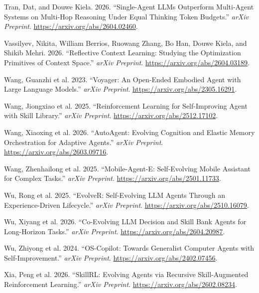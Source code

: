 \documentclass[
]{article}
\newlength{\cslhangindent}
\newenvironment{CSLReferences}[2] %
 {\begin{list}{}{%
  \setlength{\itemindent}{0pt}
  \setlength{\leftmargin}{0pt}
  \setlength{\parsep}{0pt}
  \ifodd #1
   \setlength{\leftmargin}{\cslhangindent}
   \setlength{\itemindent}{-1\cslhangindent}
  \fi
  \setlength{\itemsep}{#2\baselineskip}}}
 {\end{list}}
\begin{document}
\begin{CSLReferences}{1}{1}
Tran, Dat, and Douwe Kiela. 2026. {``Single-Agent {LLMs} Outperform
Multi-Agent Systems on Multi-Hop Reasoning Under Equal Thinking Token
Budgets.''} \emph{arXiv Preprint}.
\url{https://arxiv.org/abs/2604.02460}.

Vassilyev, Nikita, William Berrios, Ruowang Zhang, Bo Han, Douwe Kiela,
and Shikib Mehri. 2026. {``Reflective Context Learning: Studying the
Optimization Primitives of Context Space.''} \emph{arXiv Preprint}.
\url{https://arxiv.org/abs/2604.03189}.

{Wang, Guanzhi et al.} 2023. {``Voyager: An Open-Ended Embodied Agent
with Large Language Models.''} \emph{arXiv Preprint}.
\url{https://arxiv.org/abs/2305.16291}.

{Wang, Jiongxiao et al.} 2025. {``Reinforcement Learning for
Self-Improving Agent with Skill Library.''} \emph{arXiv Preprint}.
\url{https://arxiv.org/abs/2512.17102}.

{Wang, Xiaoxing et al.} 2026. {``{AutoAgent}: Evolving Cognition and
Elastic Memory Orchestration for Adaptive Agents.''} \emph{arXiv
Preprint}. \url{https://arxiv.org/abs/2603.09716}.

{Wang, Zhenhailong et al.} 2025. {``{Mobile-Agent-E}: Self-Evolving
Mobile Assistant for Complex Tasks.''} \emph{arXiv Preprint}.
\url{https://arxiv.org/abs/2501.11733}.

{Wu, Rong et al.} 2025. {``{EvolveR}: Self-Evolving {LLM} Agents Through
an Experience-Driven Lifecycle.''} \emph{arXiv Preprint}.
\url{https://arxiv.org/abs/2510.16079}.

{Wu, Xiyang et al.} 2026. {``Co-Evolving {LLM} Decision and Skill Bank
Agents for Long-Horizon Tasks.''} \emph{arXiv Preprint}.
\url{https://arxiv.org/abs/2604.20987}.

{Wu, Zhiyong et al.} 2024. {``{OS-Copilot}: Towards Generalist Computer
Agents with Self-Improvement.''} \emph{arXiv Preprint}.
\url{https://arxiv.org/abs/2402.07456}.

{Xia, Peng et al.} 2026. {``{SkillRL}: Evolving Agents via Recursive
Skill-Augmented Reinforcement Learning.''} \emph{arXiv Preprint}.
\url{https://arxiv.org/abs/2602.08234}.


\end{CSLReferences}
\end{document}
